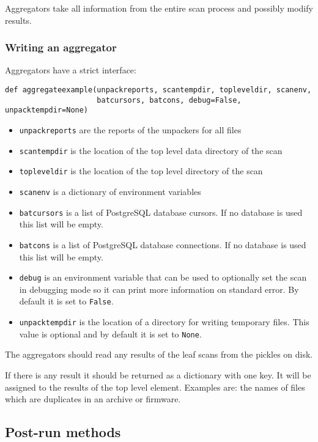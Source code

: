 \documentclass[10pt,a4paper]{article}
\begin{document}
Aggregators take all information from the entire scan process and possibly
modify results.

\subsubsection{Writing an aggregator}

Aggregators have a strict interface:

\begin{verbatim}
def aggregateexample(unpackreports, scantempdir, topleveldir, scanenv,
                     batcursors, batcons, debug=False, unpacktempdir=None)
\end{verbatim}

\begin{itemize}
\item \texttt{unpackreports} are the reports of the unpackers for all files
\item \texttt{scantempdir} is the location of the top level data directory of
the scan
\item \texttt{topleveldir} is the location of the top level directory of the
scan
\item \texttt{scanenv} is a dictionary of environment variables
\item \texttt{batcursors} is a list of PostgreSQL database cursors. If no
database is used this list will be empty.
\item \texttt{batcons} is a list of PostgreSQL database connections. If no
database is used this list will be empty.
\item \texttt{debug} is an environment variable that can be used to optionally
set the scan in debugging mode so it can print more information on standard
error. By default it is set to \texttt{False}.
\item \texttt{unpacktempdir} is the location of a directory for writing
temporary files. This value is optional and by default it is set to
\texttt{None}.
\end{itemize}

The aggregators should read any results of the leaf scans from the pickles
on disk.

If there is any result it should be returned as a dictionary with one key. It
will be assigned to the results of the top level element. Examples are: the
names of files which are duplicates in an archive or firmware.

\subsection{Post-run methods}
\end{document}
